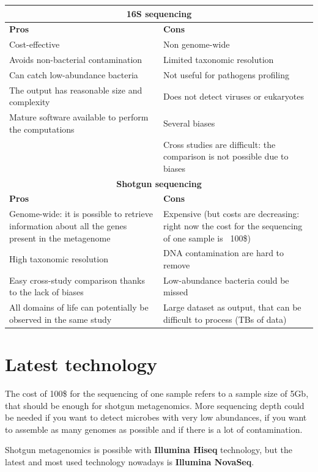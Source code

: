 \begin{tabular}{ | m{7cm}| m{7cm} | }
 \hline
 \multicolumn{2}{|c|}{\textbf{16S sequencing}} \\
 \hline
 \textbf{Pros} & \textbf{Cons} \\
 \hline
 Cost-effective & Non genome-wide \\
 Avoids non-bacterial contamination & Limited taxonomic resolution \\
 Can catch low-abundance bacteria & Not useful for pathogens profiling \\
 The output has reasonable size and complexity & Does not detect viruses or eukaryotes \\
 Mature software available to perform the computations & Several biases\\
 & Cross studies are difficult: the comparison is not possible due to biases \\
 \hline\hline
 \multicolumn{2}{|c|}{\textbf{Shotgun sequencing}} \\
 \hline
 \textbf{Pros} & \textbf{Cons} \\
 \hline
 Genome-wide: it is possible to retrieve information about all the genes present in the metagenome & Expensive (but costs are decreasing: right now the cost for the sequencing of one sample is ~100\$) \\
 High taxonomic resolution & DNA contamination are hard to remove \\
 Easy cross-study comparison thanks to the lack of biases & Low-abundance bacteria could be missed \\
 All domains of life can potentially be observed in the same study & Large dataset as output, that can be difficult to process (TBs of data) \\
 \hline
\end{tabular}

\section{Latest technology}

The cost of 100\$ for the sequencing of one sample refers to a sample size of 5Gb, that should be enough for shotgun metagenomics. More sequencing depth could be needed if you want to detect microbes with very low abundances, if you want to assemble as many genomes as possible and if there is a lot of contamination.

Shotgun metagenomics is possible with \textbf{Illumina Hiseq} technology, but the latest and most used technology nowadays is \textbf{Illumina NovaSeq}.

